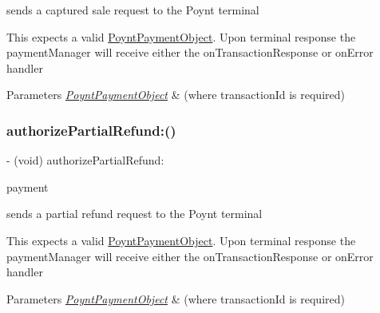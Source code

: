 sends a captured sale request to the Poynt terminal 

This expects a valid \hyperlink{interface_poynt_payment_object}{Poynt\+Payment\+Object}. Upon terminal response the payment\+Manager will receive either the on\+Transaction\+Response or on\+Error handler


\begin{DoxyParams}{Parameters}
{\em \hyperlink{interface_poynt_payment_object}{Poynt\+Payment\+Object}} & (where transaction\+Id is required) \\
\hline
\end{DoxyParams}
\hypertarget{interface_poynt_p_o_s_connection_manager_a165211f19736758772a4427902bdb932}{}\label{interface_poynt_p_o_s_connection_manager_a165211f19736758772a4427902bdb932} 
\subsubsection{\texorpdfstring{authorize\+Partial\+Refund\+:()}{authorizePartialRefund:()}}
{\footnotesize\ttfamily -\/ (void) authorize\+Partial\+Refund\+: \begin{DoxyParamCaption}\item[{(\hyperlink{interface_poynt_payment_object}{Poynt\+Payment\+Object} $\ast$)}]{payment }\end{DoxyParamCaption}}



sends a partial refund request to the Poynt terminal 

This expects a valid \hyperlink{interface_poynt_payment_object}{Poynt\+Payment\+Object}. Upon terminal response the payment\+Manager will receive either the on\+Transaction\+Response or on\+Error handler


\begin{DoxyParams}{Parameters}
{\em \hyperlink{interface_poynt_payment_object}{Poynt\+Payment\+Object}} & (where transaction\+Id is required) \\
\hline
\end{DoxyParams}
\hypertarget{interface_poynt_p_o_s_connection_manager_a3eb595755dc0ecbf9fa358f55117f021}{}\label{interface_poynt_p_o_s_connection_manager_a3eb595755dc0ecbf9fa358f55117f021} 
